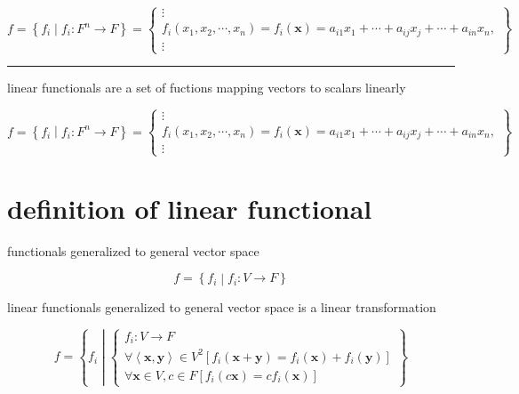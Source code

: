 \documentclass[
]{book}
\theoremstyle{definition}
\theoremstyle{definition}
\theoremstyle{definition}
\theoremstyle{definition}
\theoremstyle{remark}
\begin{document}
\[
f=\left\{ f_{{\scriptscriptstyle i}}\middle|f_{{\scriptscriptstyle i}}:F^{n}\rightarrow F\right\} =\left\{ \begin{array}{c}
\vdots\\
f_{{\scriptscriptstyle i}}\left(x_{{\scriptscriptstyle 1}},x_{{\scriptscriptstyle 2}},\cdots,x_{{\scriptscriptstyle n}}\right)=f_{{\scriptscriptstyle i}}\left(\boldsymbol{x}\right)=a_{{\scriptscriptstyle i1}}x_{{\scriptscriptstyle 1}}+\cdots+a_{{\scriptscriptstyle ij}}x_{{\scriptscriptstyle j}}+\cdots+a_{{\scriptscriptstyle in}}x_{{\scriptscriptstyle n}},\\
\vdots
\end{array}\right\} 
\]

\begin{center}\rule{0.5\linewidth}{0.5pt}\end{center}

linear functionals are a set of fuctions mapping vectors to scalars linearly

\[
f=\left\{ f_{{\scriptscriptstyle i}}\middle|f_{{\scriptscriptstyle i}}:F^{n}\rightarrow F\right\} =\left\{ \begin{array}{c}
\vdots\\
f_{{\scriptscriptstyle i}}\left(x_{{\scriptscriptstyle 1}},x_{{\scriptscriptstyle 2}},\cdots,x_{{\scriptscriptstyle n}}\right)=f_{{\scriptscriptstyle i}}\left(\boldsymbol{x}\right)=a_{{\scriptscriptstyle i1}}x_{{\scriptscriptstyle 1}}+\cdots+a_{{\scriptscriptstyle ij}}x_{{\scriptscriptstyle j}}+\cdots+a_{{\scriptscriptstyle in}}x_{{\scriptscriptstyle n}},\\
\vdots
\end{array}\right\} 
\]

\hypertarget{definition-of-linear-functional}{%
\section{definition of linear functional}\label{definition-of-linear-functional}}

functionals generalized to general vector space

\[
f=\left\{ f_{{\scriptscriptstyle i}}\middle|f_{{\scriptscriptstyle i}}:V\rightarrow F\right\} 
\]

linear functionals generalized to general vector space is a linear transformation

\[
f=\left\{ f_{{\scriptscriptstyle i}}\middle|\begin{cases}
f_{{\scriptscriptstyle i}}:V\rightarrow F\\
\forall\left\langle \boldsymbol{x},\boldsymbol{y}\right\rangle \in V^{2}\left[f_{{\scriptscriptstyle i}}\left(\boldsymbol{x}+\boldsymbol{y}\right)=f_{{\scriptscriptstyle i}}\left(\boldsymbol{x}\right)+f_{{\scriptscriptstyle i}}\left(\boldsymbol{y}\right)\right]\\
\forall\boldsymbol{x}\in V,c\in F\left[f_{{\scriptscriptstyle i}}\left(c\boldsymbol{x}\right)=cf_{{\scriptscriptstyle i}}\left(\boldsymbol{x}\right)\right]
\end{cases}\right\} 
\]
\end{document}
